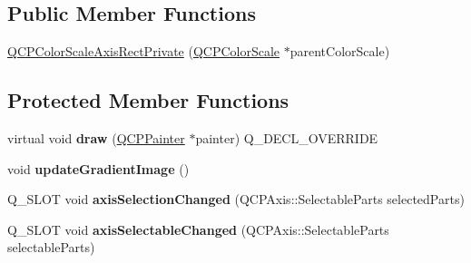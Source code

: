 \subsection*{Public Member Functions}
\begin{DoxyCompactItemize}
\item 
\hyperlink{classQCPColorScaleAxisRectPrivate_ad3b242f75dd2b33581364a4e668a80db}{Q\+C\+P\+Color\+Scale\+Axis\+Rect\+Private} (\hyperlink{classQCPColorScale}{Q\+C\+P\+Color\+Scale} $\ast$parent\+Color\+Scale)
\end{DoxyCompactItemize}
\subsection*{Protected Member Functions}
\begin{DoxyCompactItemize}
\item 
virtual void {\bfseries draw} (\hyperlink{classQCPPainter}{Q\+C\+P\+Painter} $\ast$painter) Q\+\_\+\+D\+E\+C\+L\+\_\+\+O\+V\+E\+R\+R\+I\+DE\hypertarget{classQCPColorScaleAxisRectPrivate_a52a21c7cbe086cd587c955cfe6e25e3b}{}\label{classQCPColorScaleAxisRectPrivate_a52a21c7cbe086cd587c955cfe6e25e3b}

\item 
void {\bfseries update\+Gradient\+Image} ()\hypertarget{classQCPColorScaleAxisRectPrivate_a73754cab312aeaddea1bfcc67cc079ac}{}\label{classQCPColorScaleAxisRectPrivate_a73754cab312aeaddea1bfcc67cc079ac}

\item 
Q\+\_\+\+S\+L\+OT void {\bfseries axis\+Selection\+Changed} (Q\+C\+P\+Axis\+::\+Selectable\+Parts selected\+Parts)\hypertarget{classQCPColorScaleAxisRectPrivate_a6112ad4291ac1695d37659cb049d598d}{}\label{classQCPColorScaleAxisRectPrivate_a6112ad4291ac1695d37659cb049d598d}

\item 
Q\+\_\+\+S\+L\+OT void {\bfseries axis\+Selectable\+Changed} (Q\+C\+P\+Axis\+::\+Selectable\+Parts selectable\+Parts)\hypertarget{classQCPColorScaleAxisRectPrivate_a66d2baed86966bb03a6d7c32dc7d59f7}{}\label{classQCPColorScaleAxisRectPrivate_a66d2baed86966bb03a6d7c32dc7d59f7}

\end{DoxyCompactItemize}
